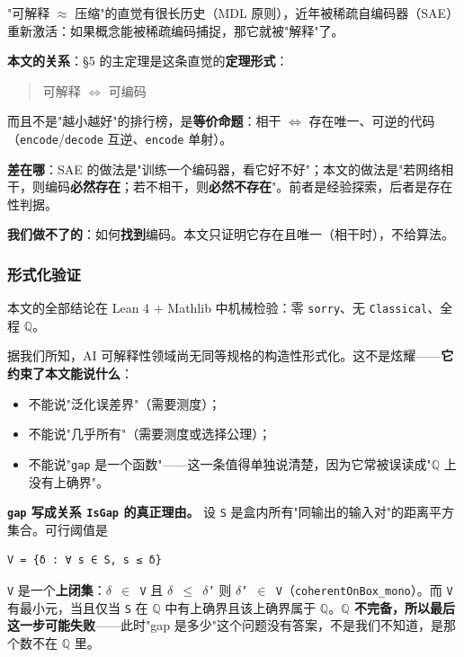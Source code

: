 \documentclass[11pt,a4paper]{ctexart}
\begin{document}
"可解释 \ensuremath{\approx} 压缩"的直觉有很长历史（MDL 原则），近年被稀疏自编码器（SAE）重新激活：如果概念能被稀疏编码捕捉，那它就被"解释"了。

\textbf{本文的关系}：§5 的主定理是这条直觉的\textbf{定理形式}：

\begin{quote}
可解释 \ensuremath{\Longleftrightarrow} 可编码
\end{quote}

而且不是"越小越好"的排行榜，是\textbf{等价命题}：相干 \ensuremath{\Longleftrightarrow} 存在唯一、可逆的代码（\texttt{encode}/\texttt{decode} 互逆、\texttt{encode} 单射）。

\textbf{差在哪}：SAE 的做法是"训练一个编码器，看它好不好"；本文的做法是"若网络相干，则编码\textbf{必然存在}；若不相干，则\textbf{必然不存在}"。前者是经验探索，后者是存在性判据。

\textbf{我们做不了的}：如何\textbf{找到}编码。本文只证明它存在且唯一（相干时），不给算法。

\subsubsection{形式化验证}

本文的全部结论在 Lean 4 + Mathlib 中机械检验：零 \texttt{sorry}、无 \texttt{Classical}、全程 \texttt{\ensuremath{\mathbb{Q}}}。

据我们所知，AI 可解释性领域尚无同等规格的构造性形式化。这不是炫耀——\textbf{它约束了本文能说什么}：

\begin{itemize}
\item 不能说"泛化误差界"（需要测度）；
\item 不能说"几乎所有"（需要测度或选择公理）；
\item 不能说"\texttt{gap} 是一个函数"——这一条值得单独说清楚，因为它常被误读成"\ensuremath{\mathbb{Q}} 上没有上确界"。
\end{itemize}

\textbf{\texttt{gap} 写成关系 \texttt{IsGap} 的真正理由。} 设 \texttt{S} 是盒内所有"同输出的输入对"的距离平方集合。可行阈值是

\begin{lstlisting}
V = {δ : ∀ s ∈ S, s ≤ δ}
\end{lstlisting}

\texttt{V} 是一个\textbf{上闭集}：\texttt{\ensuremath{\delta} \ensuremath{\in} V} 且 \texttt{\ensuremath{\delta} \ensuremath{\le} \ensuremath{\delta}'} 则 \texttt{\ensuremath{\delta}' \ensuremath{\in} V}（\texttt{coherentOnBox\_mono}）。而 \texttt{V} 有最小元，当且仅当 \texttt{S} 在 \ensuremath{\mathbb{Q}} 中有上确界且该上确界属于 \ensuremath{\mathbb{Q}}。\textbf{\ensuremath{\mathbb{Q}} 不完备，所以最后这一步可能失败}——此时"gap 是多少"这个问题没有答案，不是我们不知道，是那个数不在 \ensuremath{\mathbb{Q}} 里。
\end{document}
